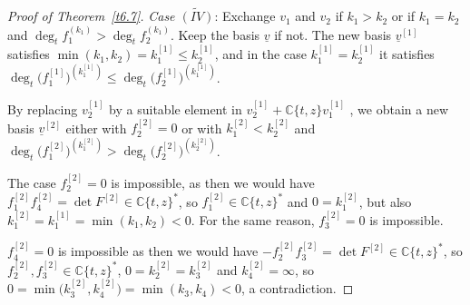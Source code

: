 \documentclass[10pt,a4paper]{amsart}
\numberwithin{equation}{section}
\numberwithin{figure}{section}
\newcommand{\C}{{\mathbb C}}
\newcommand{\www}{\widetilde}
\newcommand{\uuuu}{\underline}
\begin{document}
\begin{proof}[Proof of Theorem~\ref{t6.7}]
\medskip\noindent
{\it Case $\www{(IV)}$}: Exchange $v_1$ and $v_2$ if
$k_1>k_2$ or if $k_1=k_2$ and
$\deg_tf_1^{(k_1)}>\deg_tf_2^{(k_1)}$.
Keep the basis $\uuuu{v}$ if not. The new basis
$\uuuu{v}^{[1]}$ satisfies
$\min(k_1,k_2)=k_1^{[1]}\leq k_2^{[1]}$, and
in the case $k_1^{[1]}=k_2^{[1]}$ it satisfies
$\deg_t \big(f_1^{[1]}\big)^{(k_1^{[1]})}\leq \deg_t \big(f_2^{[1]}\big)^{(k_1^{[1]})}$.

By replacing $v_2^{[1]}$ by a suitable element in
$v_2^{[1]}+\C\{t,z\} v_1^{[1]}$ , we obtain a new basis
$\uuuu{v}^{[2]}$ either with $f_2^{[2]}=0$ or
with $k_1^{[2]}< k_2^{[2]}$ and
$\deg_t \big(f_1^{[2]}\big)^{(k_1^{[2]})}
>\deg_t \big(f_2^{[2]}\big)^{(k_2^{[2]})}$.

The case $f_2^{[2]}=0$ is impossible, as then
we would have
$f_1^{[2]}f_4^{[2]}=\det F^{[2]}\in\C\{t,z\}^*$, so
$f_1^{[2]}\in\C\{t,z\}^*$ and
$0= k_1^{[2]}$, but also $k_1^{[2]}=k_1^{[1]}=\min(k_1,k_2)<0$.
For the same reason, $f_3^{[2]}=0$ is impossible.

$f_4^{[2]}=0$ is impossible as then we would have
$-f_2^{[2]}f_3^{[2]}=\det F^{[2]}\in \C\{t,z\}^*$,
so $f_2^{[2]},f_3^{[2]}\in\C\{t,z\}^*$,
$0=k_2^{[2]}=k_3^{[2]}$ and $k_4^{[2]}=\infty$,
so $0=\min\big(k_3^{[2]},k_4^{[2]}\big)=\min(k_3,k_4)<0$,
a contradiction.


\end{proof}
\end{document}
